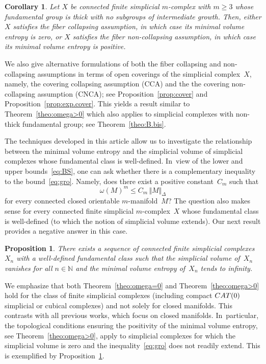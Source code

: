 \documentclass[11pt]{article}
\newtheorem{proposition}[theorem]{Proposition}
\newtheorem{corollary}[theorem]{Corollary}
\theoremstyle{definition}
\newcommand\N{{\mathbb N}}
\numberwithin{equation}{section}
\begin{document}
\begin{corollary}
Let $X$ be connected finite simplicial $m$\nobreakdash-complex with $m \geq 3$ whose fundamental group is thick with no subgroups of intermediate growth.
Then, either $X$ satisfies the fiber collapsing assumption, in which case its minimal volume entropy is zero, or $X$ satisfies the fiber non-collapsing assumption, in which case its minimal volume entropy is positive.
\end{corollary}

We also give alternative formulations of both the fiber collapsing and non-collapsing assumptions in terms of open coverings of the simplicial complex~$X$, namely, the covering collapsing assumption (CCA) and the the covering non-collapsing assumption (CNCA); see Proposition~\ref{prop:cover} and Proposition~\ref{prop:exp.cover}.
This yields a result similar to Theorem~\ref{theo:omega>0} which also applies to simplicial complexes with non-thick fundamental group; see Theorem~\ref{theo:B.bis}.

The techniques developed in this article allow us to investigate the relationship between the minimal volume entropy and the simplicial volume of simplicial complexes whose fundamental class is well-defined. In~view of the lower and upper bounds~\eqref{eq:BS}, one can ask whether there is a complementary inequality to the bound~\eqref{eq:gro}.
Namely, does there exist a positive constant~$C_m$ such that
\[
\omega(M)^m \leq C_m \, \Vert M \Vert_\Delta
\]
for every connected closed orientable $m$\nobreakdash-manifold~$M$?
The question also makes sense for every connected finite simplicial $m$\nobreakdash-complex~$X$ whose fundamental class is well-defined (to which the notion of simplicial volume extends).
Our next result provides a negative answer in this case.

\begin{proposition} \label{prop:ex}
There exists a sequence of connected finite simplicial complexes~$X_n$ with a well-defined fundamental class such that the simplicial volume of~$X_n$ vanishes for all $n \in \N$ and the minimal volume entropy of~$X_n$ tends to infinity.
\end{proposition}

We emphasize that both Theorem~\ref{theo:omega=0} and Theorem~\ref{theo:omega>0} hold for the class of finite simplicial complexes (including compact ${\rm CAT}(0)$ simplicial or cubical complexes) and not solely for closed manifolds.
This contrasts with all previous works, which focus on closed manifolds. In~particular, the topological conditions ensuring the positivity of the minimal volume entropy, see Theorem~\ref{theo:omega>0}, apply to simplicial complexes for which the simplicial volume is zero and the inequality~\eqref{eq:gro} does not readily extend.
This is exemplified by Proposition~\ref{prop:ex}.
\end{document}
